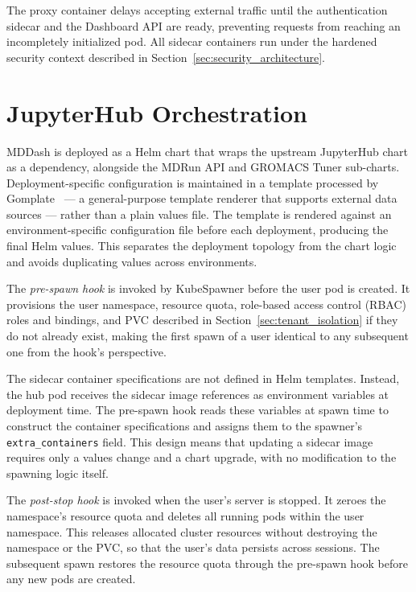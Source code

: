 \documentclass[
  digital,     %
  color,       %
  oneside,     %
  nosansbold,  %
  nocolorbold, %
  lof,         %
  lot,         %
]{fithesis4}
\begin{document}
The proxy container delays accepting external traffic until the authentication sidecar and the Dashboard API are ready, preventing requests from reaching an incompletely initialized pod. All sidecar containers run under the hardened security context described in Section~\ref{sec:security_architecture}.

\section{JupyterHub Orchestration}
\label{sec:jupyterhub_orchestration}

MDDash is deployed as a Helm chart that wraps the upstream JupyterHub chart as a dependency, alongside the MDRun API and GROMACS Tuner sub-charts. Deployment-specific configuration is maintained in a template processed by Gomplate~\cite{gomplate} --- a general-purpose template renderer that supports external data sources --- rather than a plain values file. The template is rendered against an environment-specific configuration file before each deployment, producing the final Helm values. This separates the deployment topology from the chart logic and avoids duplicating values across environments.

The \textit{pre-spawn hook} is invoked by KubeSpawner before the user pod is created. It provisions the user namespace, resource quota, role-based access control (RBAC) roles and bindings, and PVC described in Section~\ref{sec:tenant_isolation} if they do not already exist, making the first spawn of a user identical to any subsequent one from the hook's perspective.

The sidecar container specifications are not defined in Helm templates. Instead, the hub pod receives the sidecar image references as environment variables at deployment time. The pre-spawn hook reads these variables at spawn time to construct the container specifications and assigns them to the spawner's \texttt{extra\_containers} field. This design means that updating a sidecar image requires only a values change and a chart upgrade, with no modification to the spawning logic itself.

The \textit{post-stop hook} is invoked when the user's server is stopped. It zeroes the namespace's resource quota and deletes all running pods within the user namespace. This releases allocated cluster resources without destroying the namespace or the PVC, so that the user's data persists across sessions. The subsequent spawn restores the resource quota through the pre-spawn hook before any new pods are created.
\end{document}
